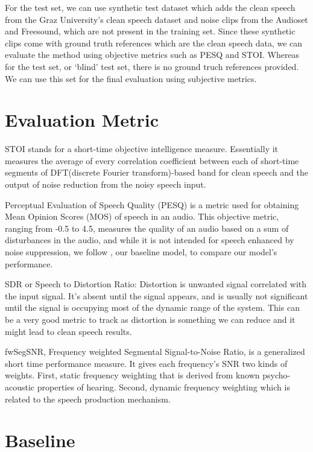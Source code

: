\documentclass[11pt]{article}
\begin{document}
For the test set, we can use synthetic test dataset which adds the clean speech from the Graz University's clean speech dataset and noise clips from the Audioset and Freesound, which are not present in the training set. Since these synthetic clips come with ground truth references which are the clean speech data, we can evaluate the method using objective metrics such as PESQ and STOI. Whereas for the test set, or `blind' test set, there is no ground truch references provided. We can use this set for the final evaluation using subjective metrics.


\section{Evaluation Metric}

STOI stands for a short-time objective intelligence measure. Essentially it measures the average of every correlation coefficient between each of short-time segments of DFT(discrete Fourier transform)-based band for clean speech and the output of noise reduction from the noisy speech input. 

Perceptual Evaluation of Speech Quality (PESQ) is a metric used for obtaining Mean Opinion Scores (MOS) of speech in an audio. This objective metric, ranging from -0.5 to 4.5, measures the quality of an audio based on a sum of disturbances in the audio, and while it is not intended for speech enhanced by noise suppression, we follow \cite{microsoftTeams}, our baseline model, to compare our model’s performance.

SDR or Speech to Distortion Ratio: Distortion is unwanted signal correlated with the input signal. It's absent until the signal appears, and is usually not significant until the signal is occupying most of the dynamic range of the system. This can be a very good metric to track as distortion is something we can reduce and it might lead to clean speech results.

fwSegSNR, Frequency weighted Segmental Signal-to-Noise Ratio, is a generalized short time performance measure. It gives each frequency’s SNR two kinds of weights. First, static frequency weighting that is derived from known psycho-acoustic properties of hearing. Second, dynamic frequency weighting which is related to the speech production mechanism.

\section{Baseline}
\end{document}
